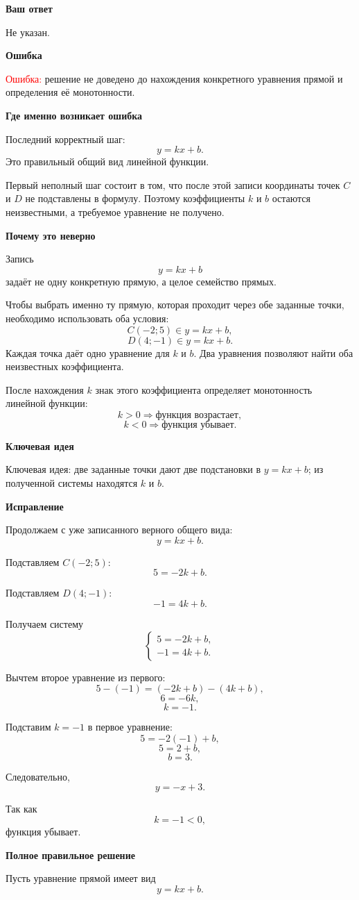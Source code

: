 \documentclass[12pt,a4paper]{article}
\newcommand{\reviewhead}[1]{%
  \par\medskip
  \noindent\textbf{#1}\par\smallskip
}
\begin{document}
\reviewhead{Ваш ответ}
Не указан.

\reviewhead{Ошибка}
\textcolor{red}{Ошибка:} решение не доведено до нахождения конкретного уравнения прямой и определения её монотонности.

\reviewhead{Где именно возникает ошибка}
Последний корректный шаг:
\[
y=kx+b.
\]
Это правильный общий вид линейной функции.

Первый неполный шаг состоит в том, что после этой записи координаты точек \(C\) и \(D\) не подставлены в формулу. Поэтому коэффициенты \(k\) и \(b\) остаются неизвестными, а требуемое уравнение не получено.

\reviewhead{Почему это неверно}
Запись
\[
y=kx+b
\]
задаёт не одну конкретную прямую, а целое семейство прямых.

Чтобы выбрать именно ту прямую, которая проходит через обе заданные точки, необходимо использовать оба условия:
\[
C(-2;5)\in y=kx+b,
\]
\[
D(4;-1)\in y=kx+b.
\]
Каждая точка даёт одно уравнение для \(k\) и \(b\). Два уравнения позволяют найти оба неизвестных коэффициента.

После нахождения \(k\) знак этого коэффициента определяет монотонность линейной функции:
\[
k>0 \Rightarrow \text{функция возрастает},
\]
\[
k<0 \Rightarrow \text{функция убывает}.
\]

\reviewhead{Ключевая идея}
\textcolor{blue!60!black}{Ключевая идея:}
две заданные точки дают две подстановки в \(y=kx+b\); из полученной системы находятся \(k\) и \(b\).

\reviewhead{Исправление}
Продолжаем с уже записанного верного общего вида:
\[
y=kx+b.
\]

Подставляем \(C(-2;5)\):
\[
5=-2k+b.
\]

Подставляем \(D(4;-1)\):
\[
-1=4k+b.
\]

Получаем систему
\[
\begin{cases}
5=-2k+b,\\
-1=4k+b.
\end{cases}
\]

Вычтем второе уравнение из первого:
\[
5-(-1)=(-2k+b)-(4k+b),
\]
\[
6=-6k,
\]
\[
k=-1.
\]

Подставим \(k=-1\) в первое уравнение:
\[
5=-2(-1)+b,
\]
\[
5=2+b,
\]
\[
b=3.
\]

Следовательно,
\[
y=-x+3.
\]

Так как
\[
k=-1<0,
\]
функция убывает.

\reviewhead{Полное правильное решение}
Пусть уравнение прямой имеет вид
\[
y=kx+b.
\]
\end{document}
